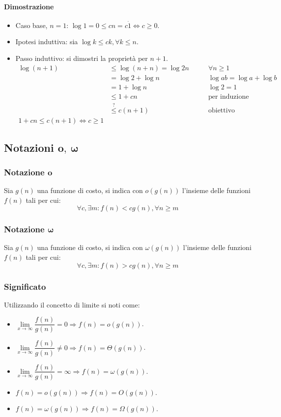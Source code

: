 \paragraph{Dimostrazione}
\begin{itemize}
\item Caso base, $n=1$: $\log 1=0\le cn=c\dot 1\Leftrightarrow c\ge 0$.
\item Ipotesi induttiva: sia $\log k\le ck, \forall k\le n$.
\item Passo induttivo: si dimostri la propriet\`a per $n+1$.
\begin{align*}
\log(n+1)&\le\log(n+n)=\log 2n\quad\quad &\forall n\ge 1\\
&=\log 2+\log n & \log ab=\log a+\log b\\
&=1+\log n & \log 2=1\\
&\le 1+cn & \text{per induzione}\\
&\overset{?}{\le} c(n+1) & \text{obiettivo}\\
1+cn\le c(n+1)\Leftrightarrow c\ge 1
\end{align*}
\end{itemize}
\subsection{Notazioni $\mathbf{o,\ \omega}$}
\subsubsection{Notazione $\mathbf{o}$}
Sia $g(n)$ una funzione di costo, si indica con $o(g(n))$ l'insieme delle funzioni $f(n)$ tali per cui:
\begin{equation*}
\forall c, \exists m: f(n)<cg(n),\forall n\ge m
\end{equation*}
\subsubsection{Notazione $\mathbf{\omega}$}
Sia $g(n)$ una funzione di costo, si indica con $\omega(g(n))$ l'insieme delle funzioni $f(n)$ tali per cui:
\begin{equation*}
\forall c, \exists m: f(n)>cg(n),\forall n\ge m
\end{equation*}
\subsubsection{Significato}
Utilizzando il concetto di limite si noti come:
\begin{itemize}
\item $\lim\limits_{x\rightarrow\infty}\dfrac{f(n)}{g(n)}=0\Rightarrow f(n)=o(g(n))$.
\item $\lim\limits_{x\rightarrow\infty}\dfrac{f(n)}{g(n)}\neq 0\Rightarrow f(n)=\Theta(g(n))$.
\item $\lim\limits_{x\rightarrow\infty}\dfrac{f(n)}{g(n)}=\infty\Rightarrow f(n)=\omega(g(n))$.
\item $f(n)=o(g(n))\Rightarrow f(n)=O(g(n))$.
\item $f(n)=\omega(g(n))\Rightarrow f(n)=\Omega(g(n))$.
\end{itemize}
